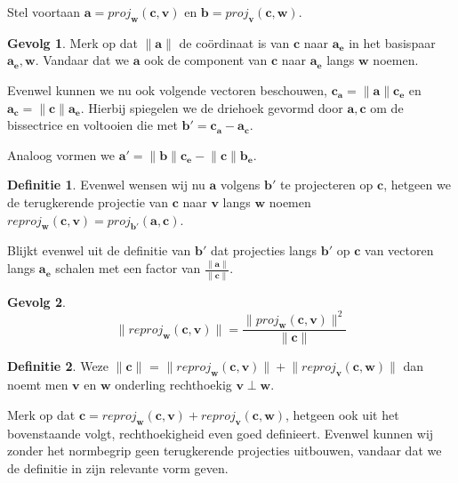 \documentclass{amsart}
\theoremstyle{definition}
\newtheorem{dfn}{Definitie}[section]
\newtheorem{csq}{Gevolg}[section]
\newcommand{\norm}[1]{\lVert{#1}\rVert}
\newcommand{\vvec}[1][v]{\mathbf{#1}}
\newcommand{\uvec}[1][v]{\vvec[#1]_\mathbf{e}}
\newcommand{\vnorm}[1]{\norm{\vvec[#1]}}
\begin{document}
Stel voortaan $\vvec[a] = proj_{\vvec[w]}(\vvec[c], \vvec)$ en $\vvec[b] = proj_{\vvec}(\vvec[c], \vvec[w])$.

\begin{csq}
	Merk op dat $\vnorm{a}$ de coördinaat is van $\vvec[c]$ naar $\uvec[a]$ in het basispaar $\uvec[a], \vvec[w]$.
	Vandaar dat we $\vvec[a]$ ook de component van $\vvec[c]$ naar $\uvec[a]$ langs $\vvec[w]$ noemen.
\end{csq}

Evenwel kunnen we nu ook volgende vectoren beschouwen, $\vvec[c_a] = \vnorm a \uvec[c]$ en $\vvec[a_c] = \vnorm c \uvec[a]$.
Hierbij spiegelen we de driehoek gevormd door $\vvec[a], \vvec[c]$ om de bissectrice en voltooien die met $\vvec[b'] = \vvec[c_a] - \vvec[a_c]$.

Analoog vormen we $\vvec[a'] = \vnorm b\uvec[c] - \vnorm c\uvec[b]$.

\begin{dfn}
	Evenwel wensen wij nu $\vvec[a]$ volgens $\vvec[b']$ te projecteren op $\vvec[c]$, hetgeen we de terugkerende projectie van $\vvec[c]$ naar $\vvec$ langs $\vvec[w]$ noemen $reproj_{\vvec[w]}(\vvec[c], \vvec) = proj_{\vvec[b']}(\vvec[a], \vvec[c])$.
\end{dfn}

Blijkt evenwel uit de definitie van $\vvec[b']$ dat projecties langs $\vvec[b']$ op $\vvec[c]$ van vectoren langs $\uvec[a]$ schalen met een factor van $\frac{\vnorm a}{\vnorm c}$.

\begin{csq}
	\begin{equation*}
		\norm{reproj_{\vvec[w]}(\vvec[c], \vvec)} = \frac{\norm{proj_{\vvec[w]}(\vvec[c], \vvec)}^2}{\vnorm c}
	\end{equation*}
\end{csq}

\begin{dfn}
	Weze $\vnorm c$ = $\norm{reproj_{\vvec[w]}(\vvec[c], \vvec)} + \norm{reproj_{\vvec}(\vvec[c], \vvec[w])}$ dan noemt men $\vvec$ en $\vvec[w]$ onderling rechthoekig $\vvec \perp \vvec[w]$.
\end{dfn}

Merk op dat $\vvec[c] = reproj_{\vvec[w]}(\vvec[c], \vvec) + reproj_{\vvec}(\vvec[c], \vvec[w])$, hetgeen ook uit het bovenstaande volgt, rechthoekigheid even goed definieert.
Evenwel kunnen wij zonder het normbegrip geen terugkerende projecties uitbouwen, vandaar dat we de definitie in zijn relevante vorm geven.
\end{document}
